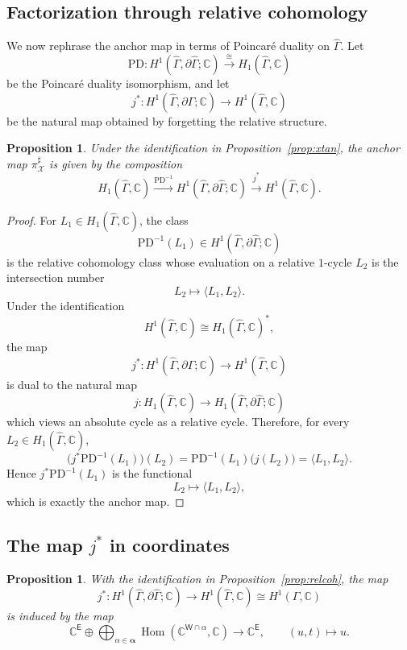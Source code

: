 \documentclass[dvipsnames,11pt]{article}
\newtheorem{proposition}[theorem]{Proposition}
\theoremstyle{definition}
\newcommand{\C}{{\mathbb C}}
\def\W{\mathsf W}
\def\E{\mathsf E}
\def\zz{\bm \alpha}
\def\PD{\mathrm{PD}}
\DeclareMathOperator{\Hom}{Hom}
\begin{document}
\subsection{Factorization through relative cohomology}

We now rephrase the anchor map in terms of Poincar\'e duality on \(\widehat \Gamma\). Let
\[
\PD:
H^1(\widehat\Gamma,\partial\widehat\Gamma;\C) \xrightarrow{\cong}
H_1(\widehat\Gamma,\C)
\]
be the Poincar\'e duality isomorphism, and let
\[
j^*:H^1(\widehat\Gamma,\partial\widehat\Gamma;\C)\to H^1(\widehat\Gamma,\C)
\]
be the natural map obtained by forgetting the relative structure.

\begin{proposition}
Under the identification in Proposition~\ref{prop:xtan}, the anchor map \(\pi^\sharp_{\mathcal X}\) is given by the composition
\[
H_1(\widehat\Gamma,\C) \xrightarrow[]{\PD^{-1}} H^1(\widehat\Gamma,\partial\widehat\Gamma;\C)\xrightarrow[]{j^*} H^1(\widehat\Gamma,\C).
\]
\end{proposition}

\begin{proof}
For \(L_1\in H_1(\widehat\Gamma,\C)\), the class
\[
\PD^{-1}(L_1)\in H^1(\widehat\Gamma,\partial\widehat\Gamma;\C)
\]
is the relative cohomology class whose evaluation on a relative \(1\)-cycle \(L_2\) is the intersection number
\[
L_2\mapsto \langle L_1,L_2\rangle.
\]
Under the identification
\[
H^1(\widehat\Gamma,\C)\cong H_1(\widehat \Gamma,\C)^*,
\]
the map
\[
j^*:H^1(\widehat\Gamma,\partial\widehat\Gamma;\C)\to H^1(\widehat\Gamma,\C)
\]
is dual to the natural map
\[
j:H_1(\widehat\Gamma,\C)\to H_1(\widehat\Gamma,\partial\widehat\Gamma;\C)
\]
which views an absolute cycle as a relative cycle. Therefore, for every
\(L_2\in H_1(\widehat\Gamma,\C)\),
\[
\bigl(j^*\PD^{-1}(L_1)\bigr)(L_2)
=
\PD^{-1}(L_1)\bigl(j(L_2)\bigr)
=
\langle L_1,L_2\rangle.
\]
Hence \(j^*\PD^{-1}(L_1)\) is the functional
\[
L_2\mapsto \langle L_1,L_2\rangle,
\]
which is exactly the anchor map.
\end{proof}

\subsection{The map \texorpdfstring{$j^*$}{j*} in coordinates}
\label{sec:pdandj}

\begin{proposition}\label{prop:jstar}
With the identification in Proposition~\ref{prop:relcoh}, the map
\[
j^*:H^1(\widehat\Gamma,\partial\widehat\Gamma;\C)\to H^1(\widehat\Gamma,\C)\cong H^1(\Gamma,\C)
\]
is induced by the map
\[
\C^\E\oplus \bigoplus_{\alpha\in\zz}\Hom(\C^{\W\cap\alpha},\C)
\rightarrow \C^\E,
\qquad
(u,t)\mapsto u.
\]
\end{proposition}
\end{document}
